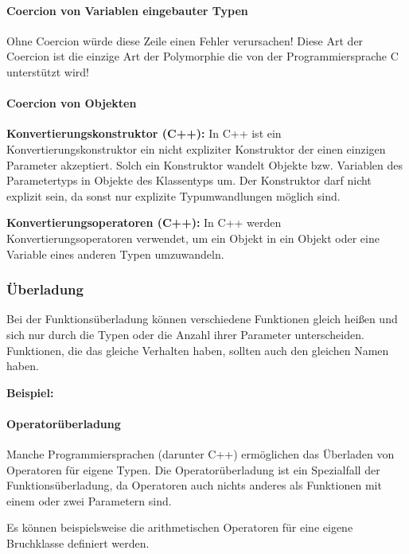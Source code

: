 			\paragraph{Coercion von Variablen eingebauter Typen}\mbox{}
			
				\UseRawInputEncoding{}
				
				Ohne Coercion würde diese Zeile einen Fehler verursachen! Diese Art der Coercion ist die einzige Art der
				Polymorphie die von der Programmiersprache C unterstützt wird!
			
			\paragraph{Coercion von Objekten}
				{\bfseries Konvertierungskonstruktor (C++):}
					In C++ ist ein Konvertierungskonstruktor ein nicht expliziter Konstruktor der einen einzigen Parameter
					akzeptiert. Solch ein Konstruktor wandelt Objekte bzw. Variablen des Parametertyps in Objekte des
					Klassentyps um. Der Konstruktor darf nicht explizit sein, da sonst nur explizite Typumwandlungen möglich
					sind.
					
					
					\UseRawInputEncoding{}
				
				{\bfseries Konvertierungsoperatoren (C++):}
					In C++ werden Konvertierungsoperatoren verwendet, um ein Objekt in ein Objekt oder eine Variable eines
					anderen Typen umzuwandeln.
					
					\UseRawInputEncoding{}
		
		\subsubsection{Überladung}
			Bei der Funktionsüberladung können verschiedene Funktionen gleich heißen und sich nur durch die Typen oder die
			Anzahl ihrer Parameter unterscheiden. Funktionen, die das gleiche Verhalten haben, sollten auch den gleichen
			Namen haben.
			
			{\bfseries Beispiel:}
				\UseRawInputEncoding{}
		
			\paragraph{Operatorüberladung}
				Manche Programmiersprachen (darunter C++) ermöglichen das Überladen von Operatoren für eigene Typen. Die
				Operatorüberladung ist ein Spezialfall der Funktionsüberladung, da Operatoren auch nichts anderes als
				Funktionen mit einem oder zwei Parametern sind.
				
				Es können beispielsweise die arithmetischen Operatoren für eine eigene Bruchklasse definiert werden.
